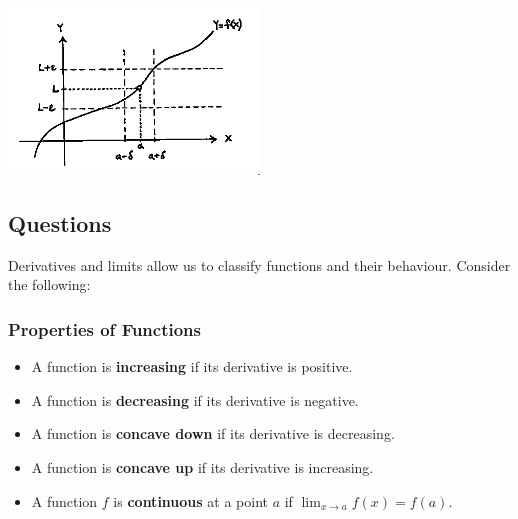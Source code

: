 \begin{center}
  \includegraphics[width=0.5\textwidth]{limit}
\end{center}

\clearpage
\subsection*{Questions}
Derivatives and limits allow us to classify functions and their behaviour. Consider the following:
\subsubsection*{Properties of Functions}
\begin{itemize}
  \item A function is \textbf{increasing} if its derivative is positive.
  \item A function is \textbf{decreasing} if its derivative is negative.
  \item A function is \textbf{concave down} if its derivative is decreasing.
  \item A function is \textbf{concave up} if its derivative is increasing.
  \item A function $ f $ is \textbf{continuous} at a point $ a $ if $ \lim_{x \to a} f(x) = f(a) $.
\end{itemize}

